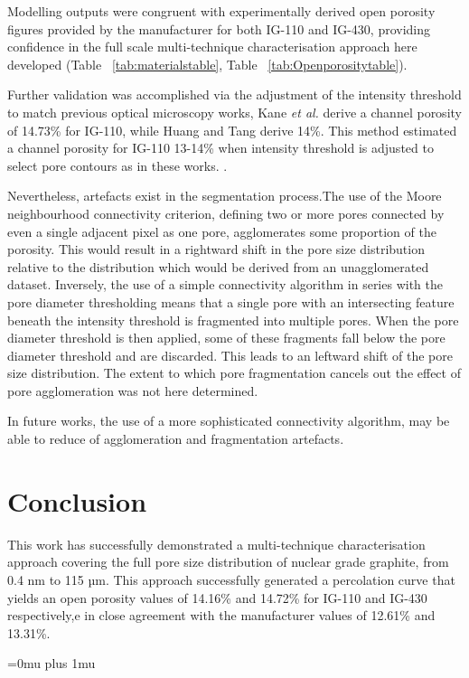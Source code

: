\documentclass[review]{elsarticle}
\begin{document}
Modelling outputs were congruent with experimentally derived open
porosity figures provided by the manufacturer for both IG-110 and IG-430,
providing confidence in the full scale multi-technique characterisation
approach here developed (Table ~\ref{tab:materialstable}, Table
~\ref{tab:Openporositytable}). 

Further validation was accomplished via the  adjustment of the intensity threshold to match previous
optical microscopy works, Kane \textit{et al.} derive a channel
porosity of 14.73\% for IG-110, while Huang and Tang derive 14\%. This method estimated a 
channel porosity for IG-110 13-14\% when intensity threshold is adjusted to
select pore contours as in these works. \citep{Kane2011a, Huang2019}.

Nevertheless, artefacts exist in the segmentation process.The use of the Moore neighbourhood connectivity criterion, defining two or
more pores connected by even a single adjacent pixel as one pore, agglomerates
some proportion of the porosity. This would result in a rightward shift in the
pore size distribution relative to the distribution which would be derived
from an unagglomerated dataset. Inversely, the use of a simple connectivity
algorithm in series with the pore diameter thresholding
means that a single pore with an intersecting feature beneath the intensity
threshold is fragmented into multiple pores. When the pore diameter threshold is then applied,
some of these fragments fall below the pore diameter threshold and are discarded.
This leads to an leftward shift of the pore size distribution. The extent to which pore fragmentation
cancels out the effect of pore agglomeration was not here determined. 

In future works, the use of a more sophisticated connectivity algorithm, 
may be able to reduce of agglomeration and fragmentation artefacts. 

  \section{Conclusion}

This work has successfully demonstrated a
multi-technique characterisation approach covering the full pore size
distribution of nuclear grade graphite, from 0.4 nm to 115 µm. This approach
successfully generated a percolation curve that yields an open porosity values of 
14.16\% and 14.72\% for IG-110 and IG-430 respectively,e in close agreement with the manufacturer values of 12.61\% and 13.31\%. 


\Urlmuskip=0mu plus 1mu\relax  %

\end{document}
